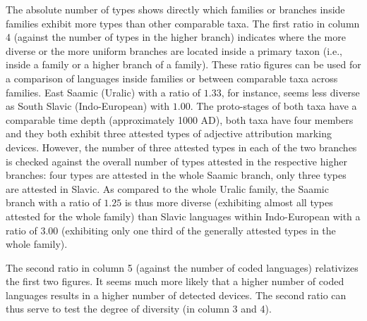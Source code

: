 The absolute number of types shows directly which families or branches inside families exhibit more types than other comparable taxa. The first ratio in column 4 (against the number of types in the higher branch) indicates where the more diverse or the more uniform branches are located inside a primary taxon (i.e., inside a family or a higher branch of a family). These ratio figures can be used for a comparison of languages inside families or between comparable taxa across families. East Saamic (Uralic) with a ratio of $1.33$, for instance, seems less diverse as South Slavic (Indo-European) with $1.00$. The proto-stages of both taxa have a comparable time depth (approximately 1000 AD), both taxa have four members and they both exhibit three attested types of adjective attribution marking devices. However, the number of three attested types in each of the two branches is checked against the overall number of types attested in the respective higher branches: four types are attested in the whole Saamic branch, only three types are attested in Slavic. As compared to the whole Uralic family, the Saamic branch with a ratio of $1.25$ is thus more diverse (exhibiting almost all types attested for the whole family) than Slavic languages within Indo-European with a ratio of $3.00$ (exhibiting only one third of the generally attested types in the whole family).

The second ratio in column 5 (against the number of coded languages) relativizes the first two figures. It seems much more likely that a higher number of coded languages results in a higher number of detected devices. The second ratio can thus serve to test the degree of diversity (in column 3 and 4). 

